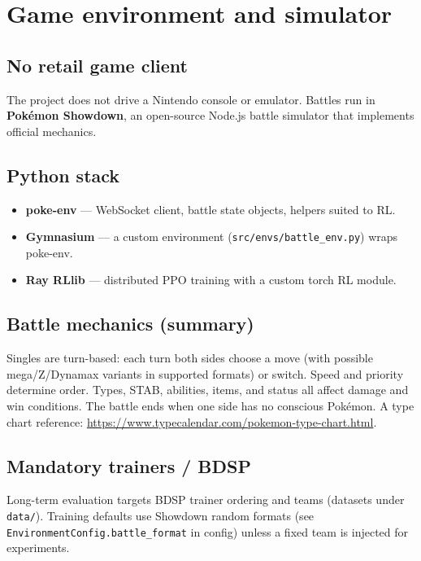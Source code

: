 \chapter{Game environment and simulator}

\section{No retail game client}
The project does not drive a Nintendo console or emulator. Battles run in \textbf{Pok\'{e}mon Showdown}, an open-source Node.js battle simulator that implements official mechanics.

\section{Python stack}
\begin{itemize}
  \item \textbf{poke-env} --- WebSocket client, battle state objects, helpers suited to RL.
  \item \textbf{Gymnasium} --- a custom environment (\texttt{src/envs/battle\_env.py}) wraps poke-env.
  \item \textbf{Ray RLlib} --- distributed PPO training with a custom torch RL module.
\end{itemize}

\section{Battle mechanics (summary)}
 Singles are turn-based: each turn both sides choose a move (with possible mega/Z/Dynamax variants in supported formats) or switch. Speed and priority determine order. Types, STAB, abilities, items, and status all affect damage and win conditions. The battle ends when one side has no conscious Pok\'{e}mon. A type chart reference: \url{https://www.typecalendar.com/pokemon-type-chart.html}.

\section{Mandatory trainers / BDSP}
Long-term evaluation targets BDSP trainer ordering and teams (datasets under \texttt{data/}). Training defaults use Showdown random formats (see \texttt{EnvironmentConfig.battle\_format} in config) unless a fixed team is injected for experiments.
